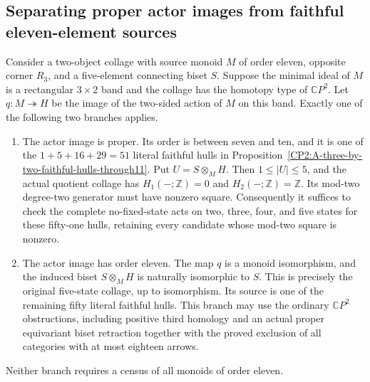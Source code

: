 \subsection{Separating proper actor images from faithful eleven-element sources}

\begin{theorem}
\label{CP2:A-eleven-three-five-faithful-image-split}
Consider a two-object collage with source monoid $M$ of order eleven,
opposite corner $R_3$, and a five-element connecting biset $S$.  Suppose
the minimal ideal of $M$ is a rectangular $3\times2$ band and the collage
has the homotopy type of $\mathbb CP^2$.  Let $q:M\twoheadrightarrow H$
be the image of the two-sided action of $M$ on this band.  Exactly one
of the following two branches applies.
\begin{enumerate}
\item The actor image is proper.  Its order is between seven and ten,
and it is one of the $1+5+16+29=51$ literal faithful hulls in
Proposition~\ref{CP2:A-three-by-two-faithful-hulls-through11}.  Put
$U=S\otimes_M H$.  Then $1\leq |U|\leq5$, and the actual quotient
collage has $H_1(-;\mathbb Z)=0$ and $H_2(-;\mathbb Z)=\mathbb Z$.
Its mod-two degree-two generator must have nonzero square.
Consequently it suffices to check the complete no-fixed-state acts
on two, three, four, and five states for these fifty-one hulls,
retaining every candidate whose mod-two square is nonzero.
\item The actor image has order eleven.  The map $q$ is a monoid
isomorphism, and the induced biset $S\otimes_M H$ is naturally
isomorphic to $S$.  This is precisely the original five-state
collage, up to isomorphism.  Its source is one of the remaining fifty
literal faithful hulls.  This branch may use the ordinary
$\mathbb CP^2$ obstructions, including positive third homology and
an actual proper equivariant biset retraction together with the
proved exclusion of all categories with at most eighteen arrows.
\end{enumerate}
Neither branch requires a census of all monoids of order eleven.
\end{theorem}

